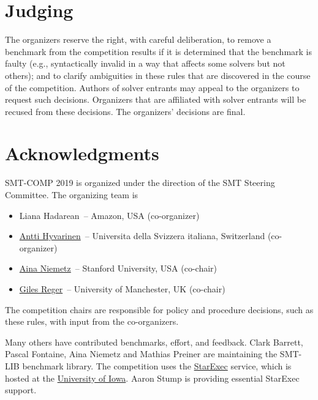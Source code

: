 \documentclass[12pt]{article}
\begin{document}

\section{Judging}

The organizers reserve the right, with careful deliberation, to remove
a benchmark from the competition results if it is determined that the
benchmark is faulty (e.g., syntactically invalid in a way that affects
some solvers but not others); and to clarify ambiguities in these
rules that are discovered in the course of the competition.  Authors
of solver entrants may appeal to the organizers to request such
decisions.  Organizers that are affiliated with solver entrants will
be recused from these decisions.  The organizers' decisions are final.


\section{Acknowledgments}

SMT-COMP 2019 is organized under the direction of the SMT Steering
Committee. The organizing team is
%
\begin{itemize}
\setlength{\itemsep}{0pt}
\item
		Liana Hadarean~-- Amazon, USA (co-organizer)
\item \href{http://www.inf.usi.ch/postdoc/hyvarinen/}{Antti Hyvarinen}~--
		Universita della Svizzera italiana, Switzerland (co-organizer)
\item
  \href{http://cs.stanford.edu/people/niemetz}{Aina
    Niemetz}~-- Stanford University, USA (co-chair)
\item \href{http://www.cs.man.ac.uk/~regerg/}{Giles Reger}~--
  University of Manchester, UK (co-chair)
\end{itemize}
%
The competition chairs are responsible for policy and procedure decisions,
such as these rules, with input from the co-organizers.

Many others have contributed benchmarks, effort, and feedback.  Clark Barrett,
Pascal Fontaine, Aina Niemetz and Mathias Preiner are maintaining the SMT-LIB
benchmark library.
The competition uses the
\href{https://www.starexec.org/}{StarExec} service, which is hosted at
the \href{http://www.cs.uiowa.edu/}{University of Iowa}.  Aaron Stump
is providing essential StarExec support.
\end{document}
